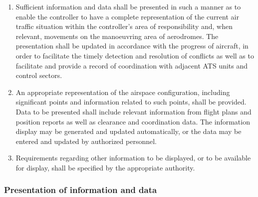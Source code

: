 \documentclass[../vATM.tex]{subfiles}
\begin{document}
    \begin{enumerate}
        \item Sufficient information and data shall be presented in such a manner as to enable the controller to have a complete representation of the current air traffic situation within the controller’s area of responsibility and, when relevant, movements on the manoeuvring area of aerodromes. The presentation shall be updated in accordance with the progress of aircraft, in order to facilitate the timely detection and resolution of conflicts as well as to facilitate and provide a record of coordination with adjacent ATS units and control sectors.
        \item An appropriate representation of the airspace configuration, including significant points and information related to such points, shall be provided. Data to be presented shall include relevant information from flight plans and position reports as well as clearance and coordination data. The information display may be generated and updated automatically, or the data may be entered and updated by authorized personnel.
        \item Requirements regarding other information to be displayed, or to be available for display, shall be specified by the appropriate authority.
    \end{enumerate}

    \subsubsection{Presentation of information and data}
\end{document}
